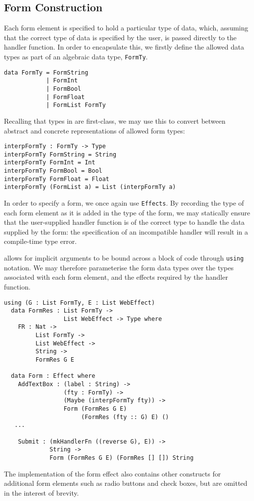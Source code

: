 \subsection{Form Construction}
\label{formcons}
Each form element is specified  to hold a particular type of data, which, assuming that the correct type of data is specified by the user, is passed directly to the handler function. In order to encapsulate this, we firstly define the allowed data types as part of an algebraic data type, \texttt{FormTy}.
\begin{Verbatim}
data FormTy = FormString
            | FormInt
            | FormBool
            | FormFloat
            | FormList FormTy 
\end{Verbatim}
Recalling that types in \idris{} are first-class, we may use this to convert between abstract and concrete representations of allowed form types:
\begin{Verbatim}
interpFormTy : FormTy -> Type
interpFormTy FormString = String
interpFormTy FormInt = Int
interpFormTy FormBool = Bool
interpFormTy FormFloat = Float
interpFormTy (FormList a) = List (interpFormTy a)
\end{Verbatim}
%
In order to specify a form, we once again use \texttt{Effects}. By recording
the type of each form element as it is added in the type of the form, we may
statically ensure that the user-supplied handler function is of the correct
type to handle the data supplied by the form: the specification of an
incompatible handler will result in a compile-time type error.

\idris{} allows for implicit arguments to be bound across a block of code
through \texttt{using} notation. We may therefore parameterise the 
form data types over
the types associated with each form element, and the effects required by the
handler function.

\begin{Verbatim}
using (G : List FormTy, E : List WebEffect)
  data FormRes : List FormTy -> 
                 List WebEffect -> Type where
    FR : Nat -> 
         List FormTy -> 
         List WebEffect -> 
         String -> 
         FormRes G E
  
  data Form : Effect where
    AddTextBox : (label : String) -> 
                 (fty : FormTy) -> 
                 (Maybe (interpFormTy fty)) -> 
                 Form (FormRes G E) 
                      (FormRes (fty :: G) E) () 
   ...
   
    Submit : (mkHandlerFn ((reverse G), E)) ->
             String -> 
             Form (FormRes G E) (FormRes [] []) String
\end{Verbatim}
The implementation of the form effect also contains other constructs for
additional form elements such as radio buttons and check boxes, but are omitted
in the interest of brevity.


